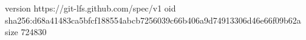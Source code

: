 version https://git-lfs.github.com/spec/v1
oid sha256:d68a41483ca5bfcf188554abcb7256039c66b406a9d74913306d46e66f09b62a
size 724830
